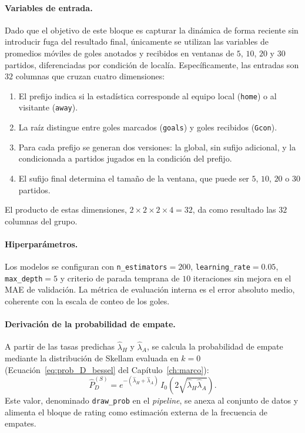 \paragraph{Variables de entrada.} Dado que el objetivo de este bloque es capturar la din\'amica de forma reciente sin introducir fuga del resultado final, \'unicamente se utilizan las variables de promedios m\'oviles de goles anotados y recibidos en ventanas de $5$, $10$, $20$ y $30$ partidos, diferenciadas por condici\'on de local\'ia. Espec\'ificamente, las entradas son $32$ columnas que cruzan cuatro dimensiones:
\begin{enumerate}
	\item El prefijo indica si la estad\'istica corresponde al equipo 	local (\texttt{home}) o al visitante (\texttt{away}).
	\item La ra\'iz distingue entre goles marcados (\texttt{goals}) y goles recibidos (\texttt{Gcon}).
	\item Para cada prefijo se generan dos versiones: la global, sin sufijo adicional, y la condicionada a partidos jugados en la condici\'on del prefijo.
	\item El sufijo final determina el tama\~no de la ventana, que puede ser $5$, $10$, $20$ o $30$ partidos.
\end{enumerate}
El producto de estas dimensiones, $2 \times 2 \times 2 \times 4 = 32$, da como resultado las $32$ columnas del grupo.

\paragraph{Hiperpar\'ametros.} Los modelos se configuran con \texttt{n\_estimators}$=200$, \texttt{learning\_rate}$=0{.}05$, \texttt{max\_depth}$=5$ y criterio de parada temprana de $10$ iteraciones sin mejora en el MAE de validaci\'on. La m\'etrica de evaluaci\'on interna es el error absoluto medio, coherente con la escala de conteo de los goles.

\paragraph{Derivaci\'on de la probabilidad de empate.} A partir de las tasas predichas $\hat{\lambda}_H$ y $\hat{\lambda}_A$, se calcula la probabilidad de empate mediante la distribuci\'on de Skellam evaluada en $k=0$ (Ecuaci\'on~\ref{eq:prob_D_bessel} del Cap\'itulo~\ref{ch:marco}):
\begin{equation}
	\hat{P}_D^{(S)} = e^{-(\hat{\lambda}_H + \hat{\lambda}_A)} \, 
	I_0\!\left(2\sqrt{\hat{\lambda}_H \hat{\lambda}_A}\right).
\end{equation}
Este valor, denominado \texttt{draw\_prob} en el \textit{pipeline}, se anexa al conjunto de datos y alimenta el bloque de rating como estimaci\'on externa de la frecuencia de empates.

